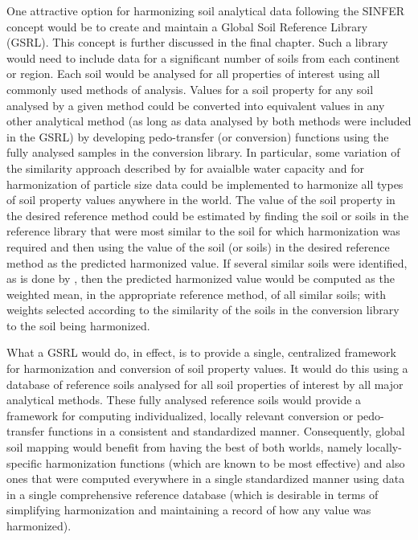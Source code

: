 \documentclass[graybox,natbib,nospthms,UStrade]{svmono}
\begin{document}
One attractive option for harmonizing soil analytical data following the
SINFER concept would be to create and maintain a Global Soil Reference
Library (GSRL). This concept is further discussed in the final chapter.
Such a library would need to include data for a significant number of
soils from each continent or region. Each soil would be analysed for all
properties of interest using all commonly used methods of analysis.
Values for a soil property for any soil analysed by a given method could
be converted into equivalent values in any other analytical method (as
long as data analysed by both methods were included in the GSRL) by
developing pedo-transfer (or conversion) functions using the fully
analysed samples in the conversion library. In particular, some
variation of the similarity approach described by \citet{Jagtap2004TASAE} for
avaialble water capacity and \citet{Nemes1999G} for harmonization
of particle size data could be implemented to harmonize all types of
soil property values anywhere in the world. The value of the soil
property in the desired reference method could be estimated by finding
the soil or soils in the reference library that were most similar to the
soil for which harmonization was required and then using the value of
the soil (or soils) in the desired reference method as the predicted
harmonized value. If several similar soils were identified, as is done
by \citet{Nemes1999G}, then the predicted harmonized value would
be computed as the weighted mean, in the appropriate reference method,
of all similar soils; with weights selected according to the similarity
of the soils in the conversion library to the soil being harmonized.

What a GSRL would do, in effect, is to provide a single, centralized
framework for harmonization and conversion of soil property values. It
would do this using a database of reference soils analysed for all soil
properties of interest by all major analytical methods. These fully
analysed reference soils would provide a framework for computing
individualized, locally relevant conversion or pedo-transfer functions
in a consistent and standardized manner. Consequently, global soil
mapping would benefit from having the best of both worlds, namely
locally-specific harmonization functions (which are known to be most
effective) and also ones that were computed everywhere in a single
standardized manner using data in a single comprehensive reference
database (which is desirable in terms of simplifying harmonization and
maintaining a record of how any value was harmonized).
\end{document}
